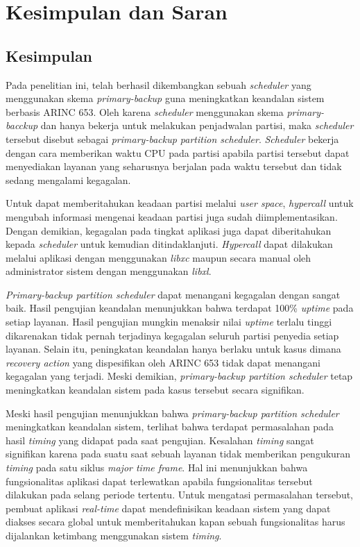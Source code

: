\chapter{Kesimpulan dan Saran}

\section{Kesimpulan}

Pada penelitian ini, telah berhasil dikembangkan sebuah \textit{scheduler} yang menggunakan
skema \textit{primary-backup} guna meningkatkan keandalan sistem berbasis ARINC 653. Oleh karena
\textit{scheduler} menggunakan skema \textit{primary-bacckup} dan hanya bekerja untuk melakukan
penjadwalan partisi, maka \textit{scheduler} tersebut disebut sebagai \textit{primary-backup
partition scheduler}. \textit{Scheduler} bekerja dengan cara memberikan waktu CPU pada partisi
apabila partisi tersebut dapat menyediakan layanan yang seharusnya berjalan pada waktu tersebut
dan tidak sedang mengalami kegagalan.

Untuk dapat memberitahukan keadaan partisi melalui \textit{user space}, \textit{hypercall} untuk
mengubah informasi mengenai keadaan partisi juga sudah diimplementasikan. Dengan demikian,
kegagalan pada tingkat aplikasi juga dapat diberitahukan kepada \textit{scheduler} untuk
kemudian ditindaklanjuti. \textit{Hypercall} dapat dilakukan melalui aplikasi dengan menggunakan
\textit{libxc} maupun secara manual oleh administrator sistem dengan menggunakan \textit{libxl}.

\textit{Primary-backup partition scheduler} dapat menangani kegagalan dengan sangat baik. Hasil
pengujian keandalan menunjukkan bahwa terdapat 100\% \textit{uptime} pada setiap layanan. Hasil
pengujian mungkin menaksir nilai \textit{uptime} terlalu tinggi dikarenakan tidak pernah
terjadinya kegagalan seluruh partisi penyedia setiap layanan. Selain itu, peningkatan keandalan
hanya berlaku untuk kasus dimana \textit{recovery action} yang dispesifikan oleh ARINC 653 tidak
dapat menangani kegagalan yang terjadi. Meski demikian, \textit{primary-backup partition
scheduler} tetap meningkatkan keandalan sistem pada kasus tersebut secara signifikan.

Meski hasil pengujian menunjukkan bahwa \textit{primary-backup partition scheduler} meningkatkan
keandalan sistem, terlihat bahwa terdapat permasalahan pada hasil \textit{timing} yang
didapat pada saat pengujian. Kesalahan \textit{timing} sangat signifikan karena pada suatu saat
sebuah layanan tidak memberikan pengukuran \textit{timing} pada satu siklus \textit{major time
frame}. Hal ini menunjukkan bahwa fungsionalitas aplikasi dapat terlewatkan apabila
fungsionalitas tersebut dilakukan pada selang periode tertentu. Untuk mengatasi permasalahan
tersebut, pembuat aplikasi \textit{real-time} dapat mendefinisikan keadaan sistem yang dapat
diakses secara global untuk memberitahukan kapan sebuah fungsionalitas harus dijalankan
ketimbang menggunakan sistem \textit{timing}.

